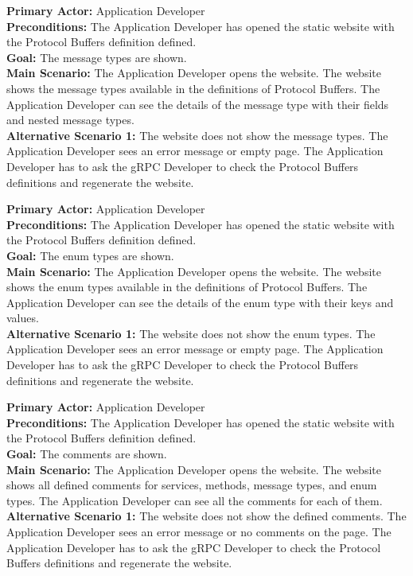 \textbf{Primary Actor:} Application Developer\\
\textbf{Preconditions:} The Application Developer has opened the static website with the Protocol Buffers definition defined.\\
\textbf{Goal:} The message types are shown.\\
\textbf{Main Scenario:}
The Application Developer opens the website.
The website shows the message types available in the definitions of Protocol Buffers.
The Application Developer can see the details of the message type with their fields and nested message types.\\
\textbf{Alternative Scenario 1:}
The website does not show the message types.
The Application Developer sees an error message or empty page.
The Application Developer has to ask the gRPC Developer to check the Protocol Buffers definitions and regenerate the website.


\textbf{Primary Actor:} Application Developer\\
\textbf{Preconditions:} The Application Developer has opened the static website with the Protocol Buffers definition defined.\\
\textbf{Goal:} The enum types are shown.\\
\textbf{Main Scenario:}
The Application Developer opens the website.
The website shows the enum types available in the definitions of Protocol Buffers.
The Application Developer can see the details of the enum type with their keys and values.\\
\textbf{Alternative Scenario 1:}
The website does not show the enum types.
The Application Developer sees an error message or empty page.
The Application Developer has to ask the gRPC Developer to check the Protocol Buffers definitions and regenerate the website.


\textbf{Primary Actor:} Application Developer\\
\textbf{Preconditions:} The Application Developer has opened the static website with the Protocol Buffers definition defined.\\
\textbf{Goal:} The comments are shown.\\
\textbf{Main Scenario:}
The Application Developer opens the website.
The website shows all defined comments for services, methods, message types, and enum types.
The Application Developer can see all the comments for each of them.\\
\textbf{Alternative Scenario 1:}
The website does not show the defined comments.
The Application Developer sees an error message or no comments on the page.
The Application Developer has to ask the gRPC Developer to check the Protocol Buffers definitions and regenerate the website.

